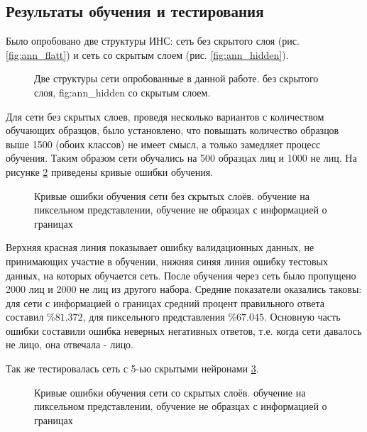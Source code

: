 \documentclass[12pt]{report}
\begin{document}
\subsection{Результаты обучения и тестирования}

Было опробовано две структуры ИНС: сеть без скрытого слоя (рис. \ref{fig:ann_flatt}) и сеть со скрытым слоем (рис. 
\ref{fig:ann_hidden}).

\begin{figure}[h]
	\centering
	\caption{Две структуры сети опробованные в данной работе.  без скрытого слоя, \subref
{fig:ann_hidden} со скрытым слоем.}
	\label{fig:ann_structure}
\end{figure}

Для сети без скрытых слоев, проведя несколько вариантов с количеством обучающих образцов, было установлено, что 
повышать количество образцов выше 1500 (обоих классов) не имеет смысл, а только замедляет процесс обучения. Таким 
образом сети обучались на 500 образцах лиц и 1000 не лиц. На рисунке \ref{fig:ann_flat_chart} приведены кривые 
ошибки обучения.

\begin{figure}[h]
	\centering
	\caption{Кривые ошибки обучения сети без скрытых слоёв.  обучение на пиксельном 
представлении, 
 обучение не образцах с информацией о границах}
	\label{fig:ann_flat_chart}
\end{figure}

Верхняя красная линия показывает ошибку валидационных данных, не принимающих участие в обучении, нижняя синяя линия 
ошибку тестовых данных, на которых обучается сеть. После обучения через сеть было пропущено 2000 лиц и 2000 не лиц 
из 
другого набора. Средние показатели оказались таковы: для сети с информацией о границах средний процент правильного 
ответа составил $\%81.372$, для пиксельного представления $\%67.045$. Основную часть ошибки составили ошибка  
неверных негативных ответов, т.е. когда сети давалось не лицо, она отвечала - лицо.

Так же тестировалась сеть с 5-ью скрытыми нейронами \ref{fig:ann_hidd_chart}.
\begin{figure}[h]
	\centering
	\caption{Кривые ошибки обучения сети со скрытых слоёв.  обучение на пиксельном 
представлении, 
 обучение не образцах с информацией о границах}
	\label{fig:ann_hidd_chart}
\end{figure}
\end{document}
